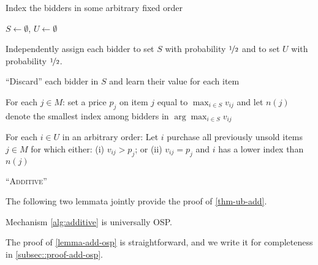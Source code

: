 \begin{algorithm2e}

 Index the bidders in some arbitrary fixed order


 $S \leftarrow \emptyset$, $U \leftarrow \emptyset$
 
Independently assign each bidder to set $S$ with probability $\nicefrac{1}{2}$ and to set $U$ with probability $\nicefrac{1}{2}$.

 ``Discard'' each bidder in $S$ and learn their value for each item

 For each $j \in M$: set a price $p_j$ on item $j$ equal to $\max_{i \in S}{v_{ij}}$ and let $n(j)$ denote the smallest index among bidders in $\arg\max_{i \in S}{v_{ij}}$
 
 For each $i \in U$ in an arbitrary order:  Let $i$ purchase all previously unsold items $j \in M$ for which either: (i) $v_{ij} > p_j$; or (ii) $v_{ij} = p_j$ and $i$ has a lower index than $n(j)$
 
 \caption{``\textsc{Additive}''}
 \label{alg:additive}
\end{algorithm2e}
The following two lemmata jointly provide the proof of \cref{thm-ub-add}.
\begin{lemma}\label{lemma-add-osp}
Mechanism \ref{alg:additive} is universally OSP.
\end{lemma}
The proof of \cref{lemma-add-osp} is straightforward, and we write it for completeness in \cref{subsec::proof-add-osp}. 


